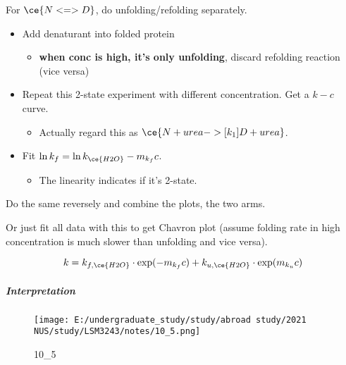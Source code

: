 \documentclass[]{article}
\let\oldsubparagraph\subparagraph
\renewcommand{\subparagraph}[1]{\oldsubparagraph{#1}\mbox{}}
\begin{document}
For \(\ce{N<=>D}\), do unfolding/refolding separately.

\begin{itemize}
\item
  Add denaturant into folded protein

  \begin{itemize}
  \item
    \textbf{when conc is high, it's only unfolding}, discard refolding
    reaction (vice versa)
  \end{itemize}
\item
  Repeat this 2-state experiment with different concentration. Get a
  \(k-c\) curve.

  \begin{itemize}
  \item
    Actually regard this as \(\ce{N + urea ->[k_1] D + urea}\).
  \end{itemize}
\item
  Fit \(\ln k_f=\ln k_{\ce{H2O}}-m_{k_f}c\).

  \begin{itemize}
  \item
    The linearity indicates if it's 2-state.
  \end{itemize}
\end{itemize}

Do the same reversely and combine the plots, the two arms.

Or just fit all data with this to get Chavron plot (assume folding rate
in high concentration is much slower than unfolding and vice versa).

\[k=k_{f,\ce{H2O}}\cdot\exp(-m_{k_f}c)+k_{u,\ce{H2O}}\cdot\exp(m_{k_u}c)\]

\hypertarget{interpretation}{%
\subparagraph{Interpretation}\label{interpretation}}

\begin{figure}
\centering
\texttt{[image: E:/undergraduate\_study/study/abroad study/2021 NUS/study/LSM3243/notes/10\_5.png]}
\caption{10\_5}
\end{figure}
\end{document}
